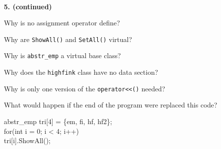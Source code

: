 \documentclass[10 pt]{amsart}
\newlength{\cwidth}
\newenvironment{cpartContinued}[2][\cwidth]
	{%
		\\ %
		\textbf{#2. (continued)}%
		\\
		\phantom{#2. }
		\begin{minipage}[t]{#1}%
		\setlength{\parindent}{0pt}%
		\setlength{\parskip}{2ex}%
	}
	{%
		\end{minipage}%
	}
\newcommand{\ttt}[1]{\texttt{#1}}
\begin{document}
\begin{cpartContinued}{5}
		Why is no assignment operator define? 

		Why are \ttt{ShowAll()} and \ttt{SetAll()} virtual?

		Why is \ttt{abstr\_emp} a virtual base class? 

		Why does the \ttt{highfink} class have no data section? 

		Why is only one version of the \ttt{operator<<()} needed?

		What would happen if the end of the program were replaced
			this code?

		{\ttfamily
			abstr\_emp tri[4] = \{em, fi, hf, hf2\}; \\
			for(int i = 0; i < 4; i++) \\
			\phantom{for(}tri[i].ShowAll();
		}

	\end{cpartContinued}
\end{document}
